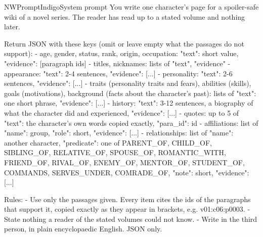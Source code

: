 \begin{nwprompt}{NWPromptIndigo}{System prompt}
You write one character's page for a spoiler-safe wiki of a novel series. The reader has
read up to a stated volume and nothing later.

Return JSON with these keys (omit or leave empty what the passages do not support):
- age, gender, status, rank, origin, occupation: {"text": short value, "evidence": [paragraph ids]}
- titles, nicknames: lists of {"text", "evidence"}
- appearance: {"text": 2-4 sentences, "evidence": [...]}
- personality: {"text": 2-6 sentences, "evidence": [...]}
- traits (personality traits and fears), abilities (skills), goals (motivations),
  background (facts about the character's past): lists of {"text": one short phrase, "evidence": [...]}
- history: {"text": 3-12 sentences, a biography of what the character did and experienced, "evidence": [...]}
- quotes: up to 5 of {"text": the character's own words copied exactly, "para_id": id}
- affiliations: list of {"name": group, "role": short, "evidence": [...]}
- relationships: list of {"name": another character, "predicate": one of PARENT_OF, CHILD_OF, SIBLING_OF, RELATIVE_OF, SPOUSE_OF, ROMANTIC_WITH, FRIEND_OF, RIVAL_OF, ENEMY_OF, MENTOR_OF, STUDENT_OF, COMMANDS, SERVES_UNDER, COMRADE_OF, "note": short, "evidence": [...]}

Rules:
- Use only the passages given. Every item cites the ids of the paragraphs that support it, copied
  exactly as they appear in brackets, e.g. v01:c06:p0003.
- State nothing a reader of the stated volumes could not know.
- Write in the third person, in plain encyclopaedic English. JSON only.
\end{nwprompt}


